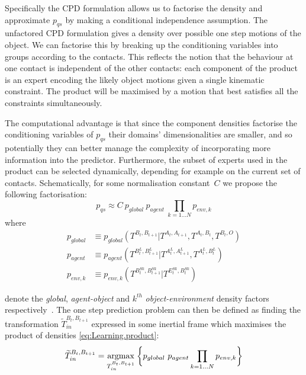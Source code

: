 Specifically the CPD formulation allows us to factorise the density
and approximate $p_{qs}$ by making a conditional independence
assumption. The unfactored CPD formulation gives a density over
possible one step motions of the object. We can
factorise this by breaking up the conditioning variables into groups
according to the contacts. This reflects the notion that the behaviour
at one contact is independent of the other contacts: each component of the
product is an expert encoding the likely object motions given a single
kinematic constraint. The product will be maximised by a
motion that best satisfies all the constraints simultaneously.

The computational advantage is that since the component
densities factorise the conditioning variables of $p_{qs}$ their
domains' dimensionalities are smaller, and so potentially they can
better manage the complexity of incorporating more information into
the predictor.  Furthermore, the subset of experts used in the product can be selected dynamically, depending for example on the current set of contacts. Schematically, for some normalisation constant~$C$ we propose the following factorisation:
\begin{equation}
p_{qs} \approx C\ p_{global}\ p_{agent}\ \mathop{\prod}_{k=1 \ldots N}{ p_{env,k}}
\label{eq:Learning.product}
\end{equation}
\noindent where
\begin{subequations}
\begin{align}
p_{global} &\equiv p_{global}(T^{B_{t}, B_{t+1}}|T^{A_{t}, A_{t+1}}, T^{A_t, B_t}, T^{B_t, O})
\label{eq:Learning.densityglobal} \\
p_{agent} &\equiv p_{agent}(T^{B^{L}_{t}, B^{L}_{t+1}}|T^{A^{L}_{t}, A^{L}_{t+1}}, T^{A^{L}_t, B^{L}_t})
\label{eq:Learning.densitylocal} \\
p_{env,k} &\equiv p_{env,k}(T^{B^{Sk}_t, B^{Sk}_{t+1}} | T^{E^{Sk}_t,B^{Sk}_t})
\label{eq:Learning.densityenv}
\end{align}
\end{subequations}

\noindent denote the \textit{global}, \textit{agent-object} and
$k^{th}$ \textit{object-environment} density factors
respectively~\cite{kopicki_prediction_2009}\cite{kopicki_prediction_2010}. 
The one step prediction problem can then be defined as finding the
transformation $\widetilde{T}_{in}^{B_{t}, B_{t+1}}$ expressed in some inertial frame which maximises the product of densities \eqref{eq:Learning.product}:
\begin{equation}
\widetilde{T}_{in}^{B_{t}, B_{t+1}} = \argmax{T_{in}^{B_{t}, B_{t+1}}} \bigg\lbrace
p_{global}\  p_{agent} \mathop{\prod}_{k=1 \ldots N}{ p_{env,k} }
\bigg\rbrace
\label{eq:Learning.MultiFactorProduct}
\end{equation}

